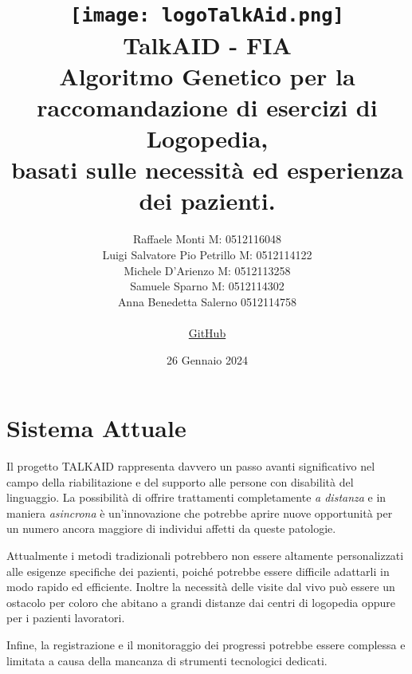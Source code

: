 \documentclass{article}
\begin{document}
    \title{
    \texttt{[image: logoTalkAid.png]} \\[1cm]
    \textbf{TalkAID - FIA}\\
    \vspace{0.5cm}
    \large Algoritmo Genetico per la raccomandazione di esercizi di Logopedia,\\
    basati sulle necessità ed esperienza dei pazienti.
}
    \author{
    Raffaele Monti M: 0512116048\\
    Luigi Salvatore Pio Petrillo M: 0512114122\\
    Michele D'Arienzo M: 0512113258\\
    Samuele Sparno M: 0512114302\\
    Anna Benedetta Salerno 0512114758\\
    \vspace{0.5cm}
    \\
    \href{https://github.com/r-monti/fia}{GitHub}
}
    \date{26 Gennaio 2024}

    \maketitle

    \pagebreak

    \tableofcontents

    \pagebreak

    \section{Sistema Attuale}

    Il progetto TALKAID rappresenta davvero un passo avanti significativo nel campo della riabilitazione e del supporto alle persone con disabilità del linguaggio. La possibilità di offrire trattamenti completamente \textit{a distanza} e in maniera \textit{asincrona} è un'innovazione che potrebbe aprire nuove opportunità per un numero ancora maggiore di individui affetti da queste patologie.

   Attualmente i metodi tradizionali potrebbero non essere altamente personalizzati alle esigenze specifiche dei pazienti, poiché potrebbe essere difficile adattarli in modo rapido ed efficiente. Inoltre la necessità delle visite dal vivo può essere un ostacolo per coloro che abitano a grandi distanze dai centri di logopedia oppure per i pazienti lavoratori.

    Infine, la registrazione e il monitoraggio dei progressi potrebbe essere complessa e limitata a causa della mancanza di strumenti tecnologici dedicati.
\end{document}
